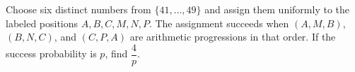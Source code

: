 Choose six distinct numbers from $\{41,\ldots,49\}$ and assign them uniformly to the labeled positions $A,B,C,M,N,P$. The assignment succeeds when $(A,M,B)$, $(B,N,C)$, and $(C,P,A)$ are arithmetic progressions in that order. If the success probability is $p$, find $\dfrac{4}{p}$.
